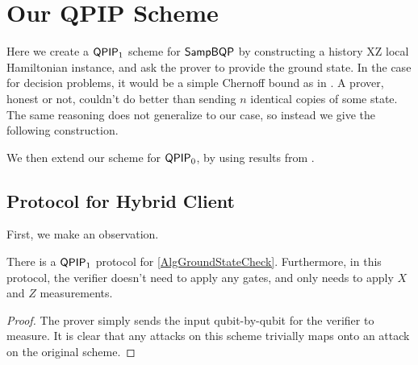 \section{Our QPIP Scheme}

Here we create a $\operatorname{\mathsf{QPIP}}_1$ scheme for $\operatorname{\mathsf{SampBQP}}$ by constructing a history XZ local Hamiltonian instance, and ask the prover to provide the ground state. In the case for decision problems, it would be a simple Chernoff bound as in \cite{kitaev2002classical}. A prover, honest or not, couldn't do better than sending $n$ identical copies of some state. The same reasoning does not generalize to our case, so instead we give the following construction.

We then extend our scheme for $\operatorname{\mathsf{QPIP}}_0$, by using results from \cite{mahadev_delegation}.

\subsection{Protocol for Hybrid Client}

First, we make an observation.

\begin{observation}
	\label{ProtoGroundStateCheck}
	There is a $\operatorname{\mathsf{QPIP}}_1$ protocol for \autoref{AlgGroundStateCheck}. Furthermore, in this protocol, the verifier doesn't need to apply any gates, and only needs to apply $X$ and $Z$ measurements.
\end{observation}
\begin{proof}
	The prover simply sends the input qubit-by-qubit for the verifier to measure. It is clear that any attacks on this scheme trivially maps onto an attack on the original scheme.
\end{proof}

